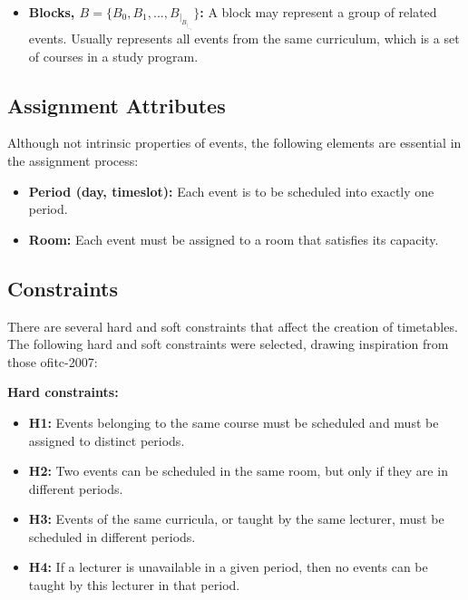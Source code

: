 \begin{itemize}
	\item \textbf{Blocks, \(B = \{B_0, B_1, ..., B_|_B_|_-_1\}\):} A block may represent a group of related events. Usually represents all events from the same curriculum, which is a set of courses in a study program.
\end{itemize}


\subsection{Assignment Attributes}

Although not intrinsic properties of events, the following elements are essential in the assignment process:

\begin{itemize}
	\item \textbf{Period (day, timeslot):} Each event is to be scheduled into exactly one period.
	\item \textbf{Room:} Each event must be assigned to a room that satisfies its capacity.
\end{itemize}


\subsection{Constraints}

There are several hard and soft constraints that affect the creation of timetables. The following hard and soft constraints were selected, drawing inspiration from those of\ac{itc-2007}:

\textbf{Hard constraints:}

\begin{itemize}
	\item \textbf{H1:} Events belonging to the same course must be scheduled and must be assigned to distinct periods.
	\item \textbf{H2:} Two events can be scheduled in the same room, but only if they are in different periods.
	\item \textbf{H3:} Events of the same curricula, or taught by the same lecturer, must be scheduled in different periods.
	\item \textbf{H4:} If a lecturer is unavailable in a given period, then no events can be taught by this lecturer in that period.
\end{itemize}

